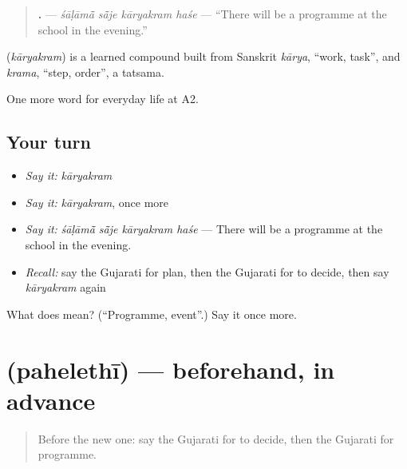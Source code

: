 \begin{quote}
\textbf{   .} — \emph{śāḷāmā̃ sā̃je kāryakram haśe} — \textquotedblleft{}There will be a programme at the school in the evening.\textquotedblright{}
\end{quote}

\begin{cousinweb}
\textbf{} (\emph{kāryakram}) is a learned compound built from Sanskrit \emph{kārya}, \textquotedblleft{}work, task\textquotedblright{}, and \emph{krama}, \textquotedblleft{}step, order\textquotedblright{}, a tatsama.
\end{cousinweb}

\begin{grammarlens}[title={What you've built}]
One more word for everyday life at A2.
\end{grammarlens}

\subsection*{Your turn}
\begin{itemize}
\raggedright
  \item \emph{Say it:} \emph{kāryakram}
  \item \emph{Say it:} \emph{kāryakram}, once more
  \item \emph{Say it:} \emph{śāḷāmā̃ sā̃je kāryakram haśe} — There will be a programme at the school in the evening.
  \item \emph{Recall:} say the Gujarati for plan, then the Gujarati for to decide, then say \emph{kāryakram} again
\end{itemize}

\begin{tcolorbox}[breakable,colback=teal!4,colframe=teal!35!black,title={Before you move on}]
What does  mean? (\textquotedblleft{}Programme, event\textquotedblright{}.) Say it once more.
\end{tcolorbox}
\section[\texorpdfstring{\gu{પહેલેથી} (pahelethī)}{પહેલેથી (pahelethī)}]{ (pahelethī) — beforehand, in advance}

\label{lesson:GU-C179-pahelethi}



\begin{quote}
Before the new one: say the Gujarati for to decide, then the Gujarati for programme.
\end{quote}

